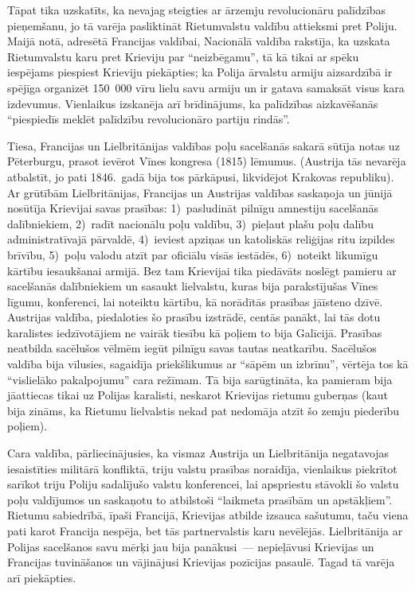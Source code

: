 \documentclass[twoside,a5paper,12pt,fleqn,openany]{extbook}
\begin{document}
Tāpat tika uzskatīts, ka nevajag steigties ar ārzemju revolucionāru palīdzības pieņemšanu, jo tā varēja pasliktināt Rietumvalstu valdību attieksmi pret Poliju. Maijā notā, adresētā Francijas valdībai, Nacionālā valdība rakstīja, ka uzskata Rietumvalstu karu pret Krieviju par ``neizbēgamu'', tā kā tikai ar spēku iespējams piespiest Krieviju piekāpties; ka Polija ārvalstu armiju aizsardzībā ir spējīga organizēt 150~000 vīru lielu savu armiju un ir gatava samaksāt visus kara izdevumus. Vienlaikus izskanēja arī brīdinājums, ka palīdzības aizkavēšanās ``piespiedīs meklēt palīdzību revolucionāro partiju rindās''.

Tiesa, Francijas un Lielbritānijas valdības poļu sacelšanās sakarā sūtīja notas uz Pēterburgu, prasot ievērot Vīnes kongresa (1815) lēmumus. (Austrija tās nevarēja atbalstīt, jo pati 1846.~gadā bija tos pārkāpusi, likvidējot Krakovas republiku). Ar grūtībām Lielbritānijas, Francijas un Austrijas valdības saskaņoja un jūnijā nosūtīja Krievijai savas prasības: 1)~pasludināt pilnīgu amnestiju sacelšanās dalībniekiem, 2)~radīt nacionālu poļu valdību, 3)~pieļaut plašu poļu dalību administratīvajā pārvaldē, 4)~ieviest apziņas un katoliskās reliģijas ritu izpildes brīvību, 5)~poļu valodu atzīt par oficiālu visās iestādēs, 6)~noteikt likumīgu kārtību iesaukšanai armijā. Bez tam Krievijai tika piedāvāts noslēgt pamieru ar sacelšanās dalībniekiem un sasaukt lielvalstu, kuras bija parakstījušas Vīnes līgumu, konferenci, lai noteiktu kārtību, kā norādītās prasības jāīsteno dzīvē. Austrijas valdība, piedaloties šo prasību izstrādē, centās panākt, lai tās dotu karalistes iedzīvotājiem ne vairāk tiesību kā poļiem to bija Galīcijā. Prasības neatbilda sacēlušos vēlmēm iegūt pilnīgu savas tautas neatkarību. Sacēlušos valdība bija vīlusies, sagaidīja priekšlikumus ar ``sāpēm un izbrīnu'', vērtēja tos kā ``vislielāko pakalpojumu'' cara režīmam. Tā bija sarūgtināta, ka pamieram bija jāattiecas tikai uz Polijas karalisti, neskarot Krievijas rietumu guberņas (kaut bija zināms, ka Rietumu lielvalstis nekad pat nedomāja atzīt šo zemju piederību poļiem).

Cara valdība, pārliecinājusies, ka vismaz Austrija un Lielbritānija negatavojas iesaistīties militārā konfliktā, triju valstu prasības noraidīja, vienlaikus piekrītot sarīkot triju Poliju sadalījušo valstu konferencei, lai apspriestu stāvokli šo valstu poļu valdījumos un saskaņotu to atbilstoši ``laikmeta prasībām un apstākļiem''. Rietumu sabiedrībā, īpaši Francijā, Krievijas atbilde izsauca sašutumu, taču viena pati karot Francija nespēja, bet tās partnervalstis karu nevēlējās. Lielbritānija ar Polijas sacelšanos savu mērķi jau bija panākusi~--- nepieļāvusi Krievijas un Francijas tuvināšanos un vājinājusi Krievijas pozīcijas pasaulē. Tagad tā varēja arī piekāpties.
\end{document}
